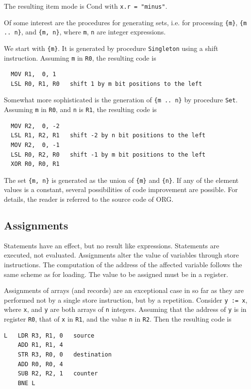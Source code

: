 The resulting item mode is Cond with \verb|x.r = "minus"|.

Of some interest are the procedures for generating sets, i.e. for processing \verb|{m}|,
\verb|{m .. n}|, and \verb|{m, n}|, where \verb|m|, \verb|n| are integer expressions.

We start with \verb|{m}|. It is generated by procedure \verb|Singleton| using a shift instruction.
Assuming \verb|m| in \verb|R0|, the resulting code is
\begin{verbatim}
  MOV R1,  0, 1
  LSL R0, R1, R0   shift 1 by m bit positions to the left
\end{verbatim}

Somewhat more sophisticated is the generation of \verb|{m .. n}| by procedure \verb|Set|. Assuming
\verb|m| in \verb|R0|, and \verb|n| is \verb|R1|, the resulting code is
\begin{verbatim}
  MOV R2,  0, -2
  LSL R1, R2, R1   shift -2 by n bit positions to the left
  MOV R2,  0, -1
  LSL R0, R2, R0   shift -1 by m bit positions to the left
  XOR R0, R0, R1
\end{verbatim}

The set \verb|{m, n}| is generated as the union of \verb|{m}| and \verb|{n}|. If any of the element
values is a constant, several possibilities of code improvement are possible. For details, the reader
is referred to the source code of ORG.

\subsection{Assignments}
Statements have an effect, but no result like expressions. Statements are executed, not evaluated.
Assignments alter the value of variables through store instructions. The computation of the address
of the affected variable follows the same scheme as for loading. The value to be assigned must be
in a register.

Assignments of arrays (and records) are an exceptional case in so far as they are performed not by
a single store instruction, but by a repetition. Consider \verb|y := x|, where \verb|x|, and \verb|y|
are both arrays of \verb|n| integers. Assuming that the address of \verb|y| is in register \verb|R0|,
that of \verb|x| in \verb|R1|, and the value \verb|n| in \verb|R2|.  Then the resulting code is
\begin{verbatim}
L   LDR R3, R1, 0   source
    ADD R1, R1, 4
    STR R3, R0, 0   destination
    ADD R0, R0, 4
    SUB R2, R2, 1   counter
    BNE L
\end{verbatim}

